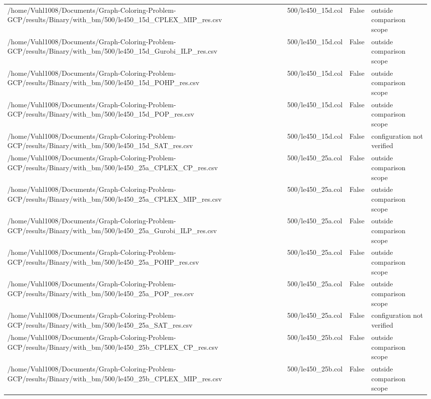 \begin{table}[htbp]
\begin{tabular}{llll}
/home/Vuhl1008/Documents/Graph-Coloring-Problem-GCP/results/Binary/with\_bm/500/le450\_15d\_CPLEX\_MIP\_res.csv & 500/le450\_15d.col & False & outside comparison scope \\
/home/Vuhl1008/Documents/Graph-Coloring-Problem-GCP/results/Binary/with\_bm/500/le450\_15d\_Gurobi\_ILP\_res.csv & 500/le450\_15d.col & False & outside comparison scope \\
/home/Vuhl1008/Documents/Graph-Coloring-Problem-GCP/results/Binary/with\_bm/500/le450\_15d\_POHP\_res.csv & 500/le450\_15d.col & False & outside comparison scope \\
/home/Vuhl1008/Documents/Graph-Coloring-Problem-GCP/results/Binary/with\_bm/500/le450\_15d\_POP\_res.csv & 500/le450\_15d.col & False & outside comparison scope \\
/home/Vuhl1008/Documents/Graph-Coloring-Problem-GCP/results/Binary/with\_bm/500/le450\_15d\_SAT\_res.csv & 500/le450\_15d.col & False & configuration not verified \\
/home/Vuhl1008/Documents/Graph-Coloring-Problem-GCP/results/Binary/with\_bm/500/le450\_25a\_CPLEX\_CP\_res.csv & 500/le450\_25a.col & False & outside comparison scope \\
/home/Vuhl1008/Documents/Graph-Coloring-Problem-GCP/results/Binary/with\_bm/500/le450\_25a\_CPLEX\_MIP\_res.csv & 500/le450\_25a.col & False & outside comparison scope \\
/home/Vuhl1008/Documents/Graph-Coloring-Problem-GCP/results/Binary/with\_bm/500/le450\_25a\_Gurobi\_ILP\_res.csv & 500/le450\_25a.col & False & outside comparison scope \\
/home/Vuhl1008/Documents/Graph-Coloring-Problem-GCP/results/Binary/with\_bm/500/le450\_25a\_POHP\_res.csv & 500/le450\_25a.col & False & outside comparison scope \\
/home/Vuhl1008/Documents/Graph-Coloring-Problem-GCP/results/Binary/with\_bm/500/le450\_25a\_POP\_res.csv & 500/le450\_25a.col & False & outside comparison scope \\
/home/Vuhl1008/Documents/Graph-Coloring-Problem-GCP/results/Binary/with\_bm/500/le450\_25a\_SAT\_res.csv & 500/le450\_25a.col & False & configuration not verified \\
/home/Vuhl1008/Documents/Graph-Coloring-Problem-GCP/results/Binary/with\_bm/500/le450\_25b\_CPLEX\_CP\_res.csv & 500/le450\_25b.col & False & outside comparison scope \\
/home/Vuhl1008/Documents/Graph-Coloring-Problem-GCP/results/Binary/with\_bm/500/le450\_25b\_CPLEX\_MIP\_res.csv & 500/le450\_25b.col & False & outside comparison scope \\

\end{tabular}
\end{table}

